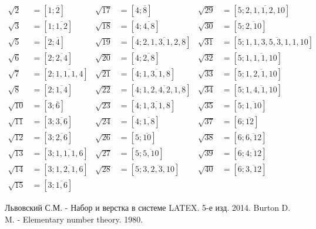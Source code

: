 \documentclass[twoside,12pt]{article}
\begin{document}
\begin{align*}
	\sqrt{2} &= [1;\overline{2}] & \sqrt{17} &= [4;\overline{8}] & \sqrt{29} &= [5;\overline{2,1,1,2,10}] \\
	\sqrt{3} &= [1;\overline{1,2}] & \sqrt{18} &= [4;\overline{4,8}] & \sqrt{30} &= [5;\overline{2,10}]\\
	\sqrt{5} &= [2;\overline{4}] & \sqrt{19} &= [4;\overline{2,1,3,1,2,8}] & \sqrt{31} &= [5;\overline{1,1,3,5,3,1,1,10}] \\
	\sqrt{6} &= [2;\overline{2,4}] & \sqrt{20} &= [4;\overline{2,8}] & \sqrt{32} &= [5;\overline{1,1,1,10}] \\
	\sqrt{7} &= [2;\overline{1,1,1,4}] & \sqrt{21} &= [4;\overline{1,3,1,8}] & \sqrt{33} &= [5;\overline{1,2,1,10}]\\
	\sqrt{8} &= [2;\overline{1,4}] & \sqrt{22} &= [4;\overline{1,2,4,2,1,8}] & \sqrt{34} &= [5;\overline{1,4,1,10}] \\
	\sqrt{10} &= [3;\overline{6}] & \sqrt{23} &= [4;\overline{1,3,1,8}] & \sqrt{35} &= [5;\overline{1,10}]\\
	\sqrt{11} &= [3;\overline{3,6}] & \sqrt{24} &= [4;\overline{1,8}] & \sqrt{37} &= [6;\overline{12}] \\
	\sqrt{12} &= [3;\overline{2,6}] & \sqrt{26} &= [5;\overline{10}] & \sqrt{38} &= [6;\overline{6,12}] \\
	\sqrt{13} &= [3;\overline{1,1,1,6}] & \sqrt{27} &= [5;\overline{5,10}] & \sqrt{39} &= [6;\overline{4;12}] \\
	\sqrt{14} &= [3;\overline{1,2,1,6}] & \sqrt{28} &= [5;\overline{3,2,3,10}] & \sqrt{40} &= [6;\overline{3,12}] \\
	\sqrt{15} &= [3;\overline{1,6}]
\end{align*}
\newpage
\begin{thebibliography}{3}
	Львовский С.М. - Набор и верстка в системе LATEX. 5-е изд. 2014.
	Burton D. M. - Elementary number theory. 1980.
\end{thebibliography}
	
\end{document}
